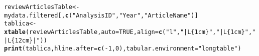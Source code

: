 \documentclass{article}\usepackage[]{graphicx}\usepackage[]{color}
\makeatletter
\newcommand{\hlnum}[1]{\textcolor[rgb]{0.686,0.059,0.569}{#1}}%
\newcommand{\hlstr}[1]{\textcolor[rgb]{0.192,0.494,0.8}{#1}}%
\newcommand{\hlopt}[1]{\textcolor[rgb]{0,0,0}{#1}}%
\newcommand{\hlstd}[1]{\textcolor[rgb]{0.345,0.345,0.345}{#1}}%
\newcommand{\hlkwb}[1]{\textcolor[rgb]{0.69,0.353,0.396}{#1}}%
\newcommand{\hlkwc}[1]{\textcolor[rgb]{0.333,0.667,0.333}{#1}}%
\newcommand{\hlkwd}[1]{\textcolor[rgb]{0.737,0.353,0.396}{\textbf{#1}}}%
\newenvironment{kframe}{%
 \def\at@end@of@kframe{}%
 \ifinner\ifhmode%
  \def\at@end@of@kframe{\end{minipage}}%
  \begin{minipage}{\columnwidth}%
 \fi\fi%
 \def\FrameCommand##1{\hskip\@totalleftmargin \hskip-\fboxsep
 \colorbox{shadecolor}{##1}\hskip-\fboxsep
     \hskip-\linewidth \hskip-\@totalleftmargin \hskip\columnwidth}%
 \MakeFramed {\advance\hsize-\width
   \@totalleftmargin\z@ \linewidth\hsize
   \@setminipage}}%
 {\par\unskip\endMakeFramed%
 \at@end@of@kframe}
\makeatother
\begin{document}
\begin{kframe}
\begin{alltt}
\hlstd{reviewArticlesTable} \hlkwb{<-} \hlstd{mydata.filtered[,}\hlkwd{c}\hlstd{(}\hlstr{"AnalysisID"}\hlstd{,}\hlstr{"Year"}\hlstd{,}\hlstr{"ArticleName"}\hlstd{)]}
\hlstd{tablica} \hlkwb{<-} \hlkwd{xtable}\hlstd{(reviewArticlesTable,}\hlkwc{auto}\hlstd{=}\hlnum{TRUE}\hlstd{,} \hlkwc{align} \hlstd{=} \hlkwd{c}\hlstd{(}\hlstr{"l"}\hlstd{,}\hlstr{"|L\{1cm\}"}\hlstd{,} \hlstr{"|L\{1cm\}"}\hlstd{,} \hlstr{"|L\{12cm\}|"}\hlstd{))}
\hlkwd{print}\hlstd{(tablica,} \hlkwc{hline.after}\hlstd{=}\hlkwd{c}\hlstd{(}\hlopt{-}\hlnum{1}\hlstd{,} \hlnum{0}\hlstd{),} \hlkwc{tabular.environment} \hlstd{=} \hlstr{"longtable"}\hlstd{)}
\end{alltt}


{\ttfamily\noindent{}}\end{kframe}%
\end{document}
